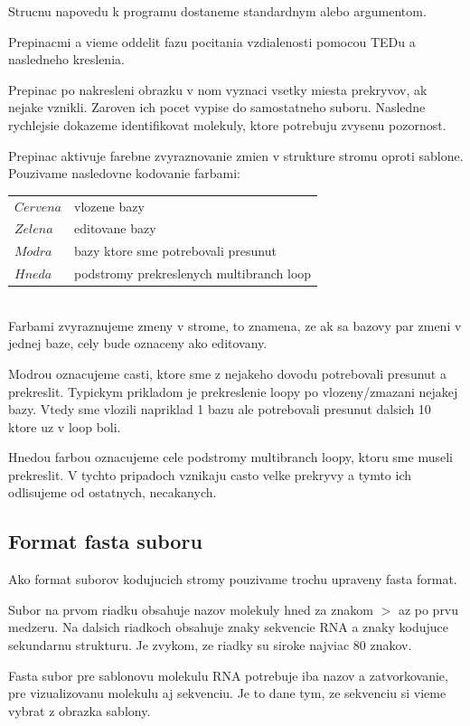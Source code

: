 Strucnu napovedu k programu dostaneme standardnym  alebo  argumentom.

Prepinacmi  a  vieme oddelit fazu pocitania vzdialenosti pomocou TEDu a nasledneho kreslenia.

Prepinac  po nakresleni obrazku v nom vyznaci vsetky miesta prekryvov, ak nejake vznikli.
Zaroven ich pocet vypise do samostatneho suboru. Nasledne rychlejsie dokazeme identifikovat molekuly, ktore
potrebuju zvysenu pozornost.

Prepinac  aktivuje farebne zvyraznovanie zmien v strukture stromu oproti sablone.
Pouzivame nasledovne kodovanie farbami:

\begin{tabular}{@{$\bullet$ }ll}
  $Cervena$ & vlozene bazy
  \\
  $Zelena$  & editovane bazy
  \\
  $Modra$   & bazy ktore sme potrebovali presunut
  \\
  $Hneda$   & podstromy prekreslenych multibranch loop
\end{tabular}
\\

Farbami zvyraznujeme zmeny v strome, to znamena, ze ak sa bazovy par zmeni v jednej baze,
cely bude oznaceny ako editovany.

Modrou oznacujeme casti, ktore sme z nejakeho dovodu potrebovali presunut a prekreslit. Typickym prikladom
je prekreslenie loopy po vlozeny/zmazani nejakej bazy. Vtedy sme vlozili napriklad 1 bazu ale potrebovali
presunut dalsich 10 ktore uz v loop boli.

Hnedou farbou oznacujeme cele podstromy multibranch loopy, ktoru sme museli prekreslit.
V tychto pripadoch vznikaju casto velke prekryvy a tymto ich odlisujeme od ostatnych, necakanych.

\subsection{Format fasta suboru}

Ako format suborov kodujucich stromy pouzivame trochu upraveny fasta format.

Subor na prvom riadku obsahuje nazov molekuly hned za znakom $>$ az po prvu medzeru.
Na dalsich riadkoch obsahuje znaky sekvencie RNA a znaky kodujuce sekundarnu strukturu.
Je zvykom, ze riadky su siroke najviac 80 znakov.

Fasta subor pre sablonovu molekulu RNA potrebuje iba nazov a zatvorkovanie, pre
vizualizovanu molekulu aj sekvenciu. Je to dane tym, ze sekvenciu si vieme vybrat z obrazka sablony.

